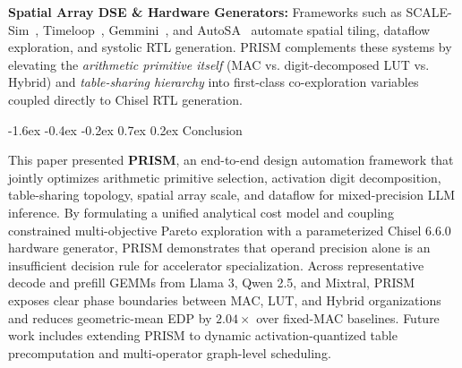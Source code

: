 \documentclass[10pt,letterpaper,twocolumn]{article}
\makeatletter
\renewcommand\section{\@startsection {section}{1}{\z@}%
  {-1.6ex \@plus -0.4ex \@minus -0.2ex}%
  {0.7ex \@plus 0.2ex}%
  {\normalfont\large\bfseries\color{primary}}}
\makeatother
\begin{document}
\textbf{Spatial Array DSE \& Hardware Generators:} Frameworks such as SCALE-Sim~\cite{samajdar2018scalesim}, Timeloop~\cite{parashar2019timeloop}, Gemmini~\cite{genc2021gemmini}, and AutoSA~\cite{wang2021autosa} automate spatial tiling, dataflow exploration, and systolic RTL generation. PRISM complements these systems by elevating the \emph{arithmetic primitive itself} (MAC vs. digit-decomposed LUT vs. Hybrid) and \emph{table-sharing hierarchy} into first-class co-exploration variables coupled directly to Chisel RTL generation.

\begin{table}[t]
  \centering
  \caption{\textbf{Comparison of PRISM with prior accelerator architectures and DSE flows.}}
  \label{tab:related}
\end{table}

\section{Conclusion}

This paper presented \textbf{PRISM}, an end-to-end design automation framework that jointly optimizes arithmetic primitive selection, activation digit decomposition, table-sharing topology, spatial array scale, and dataflow for mixed-precision LLM inference. By formulating a unified analytical cost model and coupling constrained multi-objective Pareto exploration with a parameterized Chisel 6.6.0 hardware generator, PRISM demonstrates that operand precision alone is an insufficient decision rule for accelerator specialization. Across representative decode and prefill GEMMs from Llama 3, Qwen 2.5, and Mixtral, PRISM exposes clear phase boundaries between MAC, LUT, and Hybrid organizations and reduces geometric-mean EDP by $2.04\times$ over fixed-MAC baselines. Future work includes extending PRISM to dynamic activation-quantized table precomputation and multi-operator graph-level scheduling.
\end{document}

